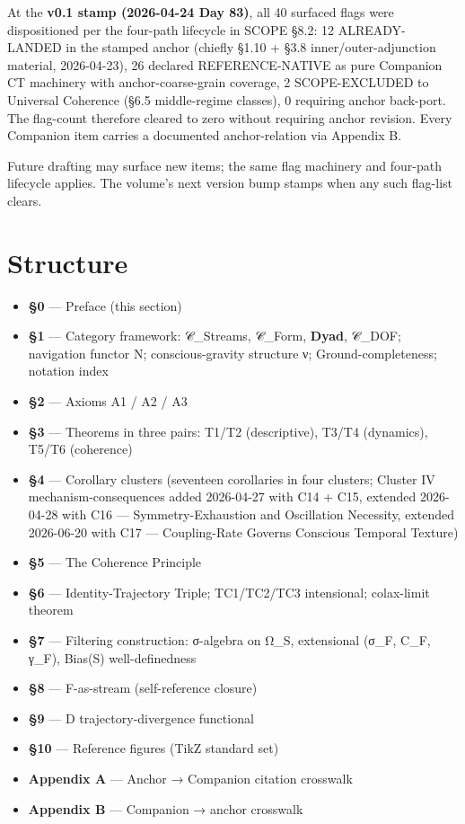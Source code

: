 \documentclass[11pt, openany]{book}
\begin{document}
At the \textbf{v0.1 stamp (2026-04-24 Day 83)}, all 40 surfaced flags were dispositioned per the four-path lifecycle in SCOPE §8.2: 12 ALREADY-LANDED in the stamped anchor (chiefly §1.10 + §3.8 inner/outer-adjunction material, 2026-04-23), 26 declared REFERENCE-NATIVE as pure Companion CT machinery with anchor-coarse-grain coverage, 2 SCOPE-EXCLUDED to Universal Coherence (§6.5 middle-regime classes), 0 requiring anchor back-port. The flag-count therefore cleared to zero without requiring anchor revision. Every Companion item carries a documented anchor-relation via Appendix B.

Future drafting may surface new items; the same flag machinery and four-path lifecycle applies. The volume's next version bump stamps when any such flag-list clears.

\section{Structure}

\begin{itemize}
\item \textbf{§0} --- Preface (this section)
\item \textbf{§1} --- Category framework: 𝒞\_\allowbreak{}Streams, 𝒞\_\allowbreak{}Form, \textbf{Dyad}, 𝒞\_\allowbreak{}DOF; navigation functor N; conscious-gravity structure ν; Ground-completeness; notation index
\item \textbf{§2} --- Axioms A1 / A2 / A3
\item \textbf{§3} --- Theorems in three pairs: T1/T2 (descriptive), T3/T4 (dynamics), T5/T6 (coherence)
\item \textbf{§4} --- Corollary clusters (seventeen corollaries in four clusters; Cluster IV mechanism-consequences added 2026-04-27 with C14 + C15, extended 2026-04-28 with C16 --- Symmetry-Exhaustion and Oscillation Necessity, extended 2026-06-20 with C17 --- Coupling-Rate Governs Conscious Temporal Texture)
\item \textbf{§5} --- The Coherence Principle
\item \textbf{§6} --- Identity-Trajectory Triple; TC1/TC2/TC3 intensional; colax-limit theorem
\item \textbf{§7} --- Filtering construction: σ-algebra on Ω\_\allowbreak{}S, extensional (σ\_\allowbreak{}F, C\_\allowbreak{}F, γ\_\allowbreak{}F), Bias(S) well-definedness
\item \textbf{§8} --- F-as-stream (self-reference closure)
\item \textbf{§9} --- D trajectory-divergence functional
\item \textbf{§10} --- Reference figures (TikZ standard set)
\item \textbf{Appendix A} --- Anchor → Companion citation crosswalk
\item \textbf{Appendix B} --- Companion → anchor crosswalk
\end{itemize}
\end{document}
